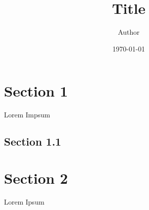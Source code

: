 \documentclass[11pt]{article}
\title{ Title}
\author{ Author }
\date{\today}
\begin{document}
\maketitle	
\pagebreak


\tableofcontents
\pagebreak


\section{Section 1} %

Lorem Impsum

\subsection{Section 1.1} %

\pagebreak

\section{Section 2}

Lorem Ipsum \\

\end{document}

